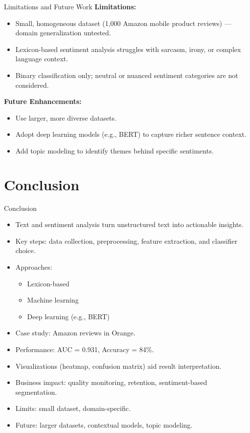 \documentclass[aspectratio=169, table]{beamer}
\begin{document}
\begin{frame}{Limitations and Future Work}
	\vspace{20pt}
	\textbf{Limitations:}
	\begin{itemize}
		\item Small, homogeneous dataset (1,000 Amazon mobile product reviews) — domain generalization untested.
		\item Lexicon-based sentiment analysis struggles with sarcasm, irony, or complex language context.
		\item Binary classification only; neutral or nuanced sentiment categories are not considered.
	\end{itemize}
	
	\vspace{0.5em}
	\textbf{Future Enhancements:}
	\begin{itemize}
		\item Use larger, more diverse datasets.
		\item Adopt deep learning models (e.g., BERT) to capture richer sentence context.
		\item Add topic modeling to identify themes behind specific sentiments.
	\end{itemize}
\end{frame}

\section{Conclusion}
\begin{frame}{Conclusion}
	\vspace{20pt}
	\begin{itemize}
		\item Text and sentiment analysis turn unstructured text into actionable insights.
		\item Key steps: data collection, preprocessing, feature extraction, and classifier choice.
		\item Approaches:
		\begin{itemize}
			\item Lexicon-based
			\item Machine learning
			\item Deep learning (e.g., BERT)
		\end{itemize}
		\item Case study: Amazon reviews in Orange.
		\item Performance: AUC = 0.931, Accuracy = 84\%.
		\item Visualizations (heatmap, confusion matrix) aid result interpretation.
		\item Business impact: quality monitoring, retention, sentiment-based segmentation.
		\item Limits: small dataset, domain-specific.
		\item Future: larger datasets, contextual models, topic modeling.
	\end{itemize}
\end{frame}
\end{document}
